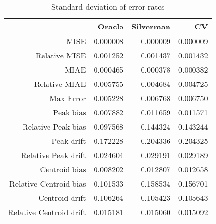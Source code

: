 \begin{table}[ht]
\centering
\begin{tabular}{rrrr}
  \hline
 & Oracle & Silverman & CV \\ 
  \hline
MISE & 0.000008 & 0.000009 & 0.000009 \\ 
  Relative MISE & 0.001252 & 0.001437 & 0.001432 \\ 
  MIAE & 0.000465 & 0.000378 & 0.000382 \\ 
  Relative MIAE & 0.005755 & 0.004684 & 0.004725 \\ 
  Max Error & 0.005228 & 0.006768 & 0.006750 \\ 
  Peak bias & 0.007882 & 0.011659 & 0.011571 \\ 
  Relative Peak bias & 0.097568 & 0.144324 & 0.143244 \\ 
  Peak drift & 0.172228 & 0.204336 & 0.204325 \\ 
  Relative Peak drift & 0.024604 & 0.029191 & 0.029189 \\ 
  Centroid bias & 0.008202 & 0.012807 & 0.012658 \\ 
  Relative Centroid bias & 0.101533 & 0.158534 & 0.156701 \\ 
  Centroid drift & 0.106264 & 0.105423 & 0.105643 \\ 
  Relative Centroid drift & 0.015181 & 0.015060 & 0.015092 \\ 
   \hline
\end{tabular}
\caption{Standard deviation of error rates} 
\label{tbl:stddev_error_rates}
\end{table}
